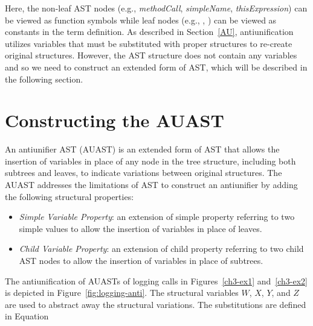 Here, the non-leaf AST nodes (e.g., \textit{methodCall}, \textit{simpleName}, \textit{thisExpression}) can be viewed as function symbols while leaf nodes (e.g., , ) can be viewed as constants in the term definition. As described in Section~\ref{AU}, antiunification utilizes variables that must be substituted with proper structures to re-create original structures. However, the AST structure does not contain any variables and so we need to construct an extended form of AST, which will be described in the following section.


\section{Constructing the AUAST} \label{AUAST}
An antiunifier AST (AUAST) is an extended form of AST that allows the insertion of variables in place of any node in the tree structure, including both subtrees and leaves, to indicate variations between original structures. The AUAST addresses the limitations of AST to construct an antiunifier by adding the following structural properties:
\begin{itemize} [leftmargin=.4in]
\item \textit{Simple Variable Property}: an extension of simple property referring to two simple values to allow the insertion of variables in place of leaves.
\end{itemize}
\begin{itemize} [leftmargin=.4in]
\item \textit{Child Variable Property}: an extension of child property referring to two child AST nodes to allow the insertion of variables in place of subtrees.
\end{itemize}
The antiunification of AUASTs of logging calls in Figures~\ref{ch3-ex1} and~\ref{ch3-ex2} is depicted in Figure~\ref{fig:logging-anti}. The structural variables $W$, $X$, $Y$, and $Z$ are used to abstract away the structural variations.  The substitutions are defined in Equation

